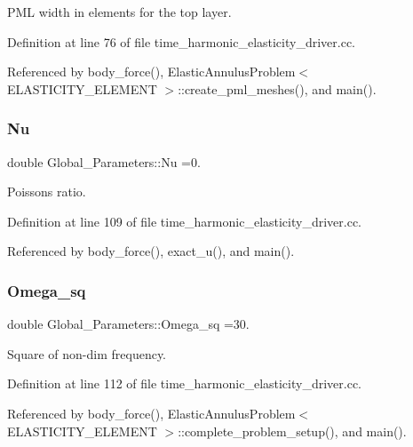 P\+ML width in elements for the top layer. 



Definition at line 76 of file time\+\_\+harmonic\+\_\+elasticity\+\_\+driver.\+cc.



Referenced by body\+\_\+force(), Elastic\+Annulus\+Problem$<$ E\+L\+A\+S\+T\+I\+C\+I\+T\+Y\+\_\+\+E\+L\+E\+M\+E\+N\+T $>$\+::create\+\_\+pml\+\_\+meshes(), and main().

\mbox{\label{namespaceGlobal__Parameters_a20fccdcfa2c15ad8b951b9ada3bb1661}} 
\subsubsection{\texorpdfstring{Nu}{Nu}}
{\footnotesize\ttfamily double Global\+\_\+\+Parameters\+::\+Nu =0.}



Poisson\textquotesingle{}s ratio. 



Definition at line 109 of file time\+\_\+harmonic\+\_\+elasticity\+\_\+driver.\+cc.



Referenced by body\+\_\+force(), exact\+\_\+u(), and main().

\mbox{\label{namespaceGlobal__Parameters_af9e1e178dfb7f5e35b452599bd4c4324}} 
\subsubsection{\texorpdfstring{Omega\+\_\+sq}{Omega\_sq}}
{\footnotesize\ttfamily double Global\+\_\+\+Parameters\+::\+Omega\+\_\+sq =30.}



Square of non-\/dim frequency. 



Definition at line 112 of file time\+\_\+harmonic\+\_\+elasticity\+\_\+driver.\+cc.



Referenced by body\+\_\+force(), Elastic\+Annulus\+Problem$<$ E\+L\+A\+S\+T\+I\+C\+I\+T\+Y\+\_\+\+E\+L\+E\+M\+E\+N\+T $>$\+::complete\+\_\+problem\+\_\+setup(), and main().


